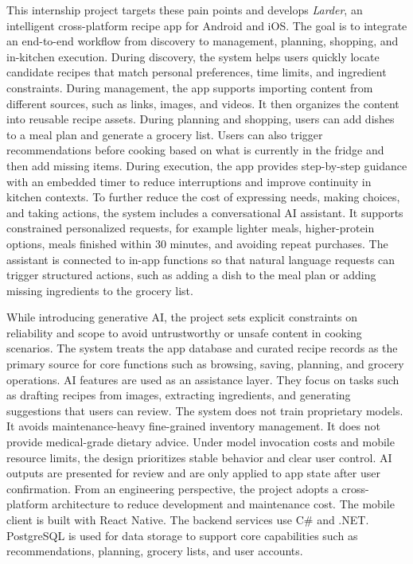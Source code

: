 \documentclass[journal]{IEEEtran}
\begin{document}
This internship project targets these pain points and develops \textit{Larder}, an intelligent cross-platform recipe app for Android and iOS. The goal is to integrate an end-to-end workflow from discovery to management, planning, shopping, and in-kitchen execution. During discovery, the system helps users quickly locate candidate recipes that match personal preferences, time limits, and ingredient constraints. During management, the app supports importing content from different sources, such as links, images, and videos. It then organizes the content into reusable recipe assets. During planning and shopping, users can add dishes to a meal plan and generate a grocery list. Users can also trigger recommendations before cooking based on what is currently in the fridge and then add missing items. During execution, the app provides step-by-step guidance with an embedded timer to reduce interruptions and improve continuity in kitchen contexts. To further reduce the cost of expressing needs, making choices, and taking actions, the system includes a conversational AI assistant. It supports constrained personalized requests, for example lighter meals, higher-protein options, meals finished within 30 minutes, and avoiding repeat purchases. The assistant is connected to in-app functions so that natural language requests can trigger structured actions, such as adding a dish to the meal plan or adding missing ingredients to the grocery list.

While introducing generative AI, the project sets explicit constraints on reliability and scope to avoid untrustworthy or unsafe content in cooking scenarios. The system treats the app database and curated recipe records as the primary source for core functions such as browsing, saving, planning, and grocery operations. AI features are used as an assistance layer. They focus on tasks such as drafting recipes from images, extracting ingredients, and generating suggestions that users can review. The system does not train proprietary models. It avoids maintenance-heavy fine-grained inventory management. It does not provide medical-grade dietary advice. Under model invocation costs and mobile resource limits, the design prioritizes stable behavior and clear user control. AI outputs are presented for review and are only applied to app state after user confirmation. From an engineering perspective, the project adopts a cross-platform architecture to reduce development and maintenance cost. The mobile client is built with React Native. The backend services use C\# and \mbox{.NET}. PostgreSQL is used for data storage to support core capabilities such as recommendations, planning, grocery lists, and user accounts.
\end{document}
